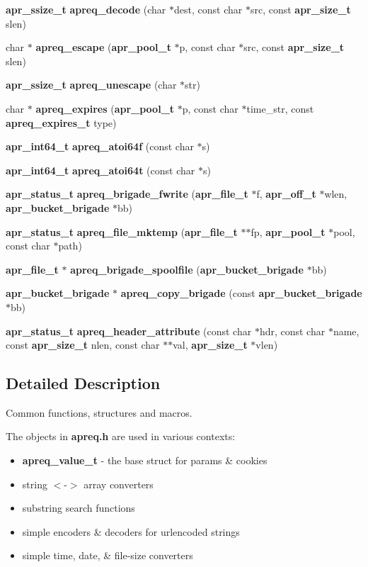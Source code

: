 \begin{CompactItemize}
\item 
{\bf apr\_\-ssize\_\-t} {\bf apreq\_\-decode} (char $\ast$dest, const char $\ast$src, const {\bf apr\_\-size\_\-t} slen)
\item 
char $\ast$ {\bf apreq\_\-escape} ({\bf apr\_\-pool\_\-t} $\ast$p, const char $\ast$src, const {\bf apr\_\-size\_\-t} slen)
\item 
{\bf apr\_\-ssize\_\-t} {\bf apreq\_\-unescape} (char $\ast$str)
\item 
char $\ast$ {\bf apreq\_\-expires} ({\bf apr\_\-pool\_\-t} $\ast$p, const char $\ast$time\_\-str, const {\bf apreq\_\-expires\_\-t} type)
\item 
{\bf apr\_\-int64\_\-t} {\bf apreq\_\-atoi64f} (const char $\ast$s)
\item 
{\bf apr\_\-int64\_\-t} {\bf apreq\_\-atoi64t} (const char $\ast$s)
\item 
{\bf apr\_\-status\_\-t} {\bf apreq\_\-brigade\_\-fwrite} ({\bf apr\_\-file\_\-t} $\ast$f, {\bf apr\_\-off\_\-t} $\ast$wlen, {\bf apr\_\-bucket\_\-brigade} $\ast$bb)
\item 
{\bf apr\_\-status\_\-t} {\bf apreq\_\-file\_\-mktemp} ({\bf apr\_\-file\_\-t} $\ast$$\ast$fp, {\bf apr\_\-pool\_\-t} $\ast$pool, const char $\ast$path)
\item 
{\bf apr\_\-file\_\-t} $\ast$ {\bf apreq\_\-brigade\_\-spoolfile} ({\bf apr\_\-bucket\_\-brigade} $\ast$bb)
\item 
{\bf apr\_\-bucket\_\-brigade} $\ast$ {\bf apreq\_\-copy\_\-brigade} (const {\bf apr\_\-bucket\_\-brigade} $\ast$bb)\label{apreq_8h_a40}

\item 
{\bf apr\_\-status\_\-t} {\bf apreq\_\-header\_\-attribute} (const char $\ast$hdr, const char $\ast$name, const {\bf apr\_\-size\_\-t} nlen, const char $\ast$$\ast$val, {\bf apr\_\-size\_\-t} $\ast$vlen)\label{apreq_8h_a41}

\end{CompactItemize}


\subsection{Detailed Description}
Common functions, structures and macros.

The objects in {\bf apreq.h} are used in various contexts:

\begin{itemize}
\item {\bf apreq\_\-value\_\-t} - the base struct for params \& cookies\item string $<$-$>$ array converters\item substring search functions\item simple encoders \& decoders for urlencoded strings\item simple time, date, \& file-size converters\end{itemize}
